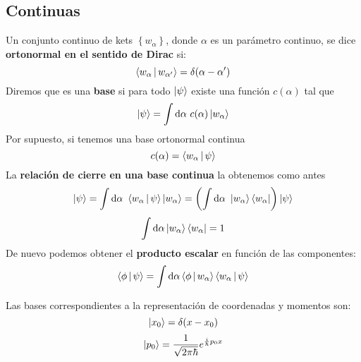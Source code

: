 \documentclass[12pt]{report}
\begin{document}
\subsection{Continuas}
Un conjunto continuo de kets $\left\{ w_{\alpha}\right\}$, donde $\alpha $ es un parámetro continuo, se dice \textbf{ortonormal en el sentido de Dirac} si:
\begin{equation}
	\Braket{w_{\alpha }|w_{\alpha '}}=\delta (\alpha -\alpha ')
\end{equation}
Diremos que es una \textbf{base} si para todo $\ket{\psi }$ existe una función $c(\alpha )$ tal que
\begin{equation}
	\ket{\psi }=\int\mathrm{d}\alpha\ c(\alpha )\ket{w_{\alpha}}
\end{equation}
Por supuesto, si tenemos una base ortonormal continua
\begin{equation}
	c(\alpha )=\Braket{w_{\alpha }|\psi}
\end{equation}
La \textbf{relación de cierre en una base continua} la obtenemos como antes
\[ \ket{\psi }=\int\mathrm{d}\alpha\ \Braket{w_{\alpha }|\psi}\ket{w_{\alpha}}=\left( \int\mathrm{d}\alpha\ \ket{w_{\alpha}}\bra{w_{\alpha }}\right)\ket{\psi} \]
\begin{equation}
	\int\mathrm{d}\alpha\ket{w_{\alpha }}\bra{w_{\alpha }}=1
\end{equation}
De nuevo podemos obtener el \textbf{producto escalar} en función de las componentes:
\begin{equation}
	\Braket{\phi |\psi }=\int\mathrm{d}\alpha\Braket{\phi |w_{\alpha}}\Braket{w_{\alpha}|\psi}
\end{equation}

Las bases correspondientes a la representación de coordenadas y momentos son:
\begin{equation}
	\ket{x_{0}}=\delta (x-x_{0})
\end{equation}
\begin{equation}
	\ket{p_{0}}=\frac{1}{\sqrt{2\pi\hbar}}e^{\frac{i}{\hbar}p_0x}
\end{equation}
\end{document}
